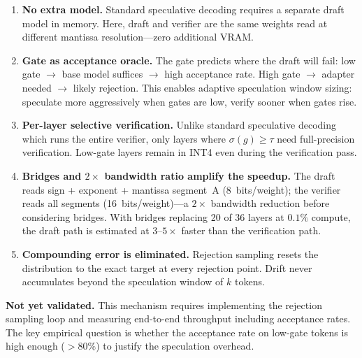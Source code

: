 \documentclass{article}
\begin{document}
\begin{enumerate}[nosep,leftmargin=1.5em]
\item \textbf{No extra model.} Standard speculative decoding requires a
      separate draft model in memory. Here, draft and verifier are the
      same weights read at different mantissa resolution---zero
      additional VRAM.
\item \textbf{Gate as acceptance oracle.} The gate predicts where the
      draft will fail: low gate $\rightarrow$ base model suffices
      $\rightarrow$ high acceptance rate. High gate $\rightarrow$ adapter
      needed $\rightarrow$ likely rejection. This enables adaptive
      speculation window sizing: speculate more aggressively when gates
      are low, verify sooner when gates rise.
\item \textbf{Per-layer selective verification.} Unlike standard
      speculative decoding which runs the entire verifier, only layers
      where $\sigma(g) \geq \tau$ need full-precision verification.
      Low-gate layers remain in INT4 even during the verification pass.
\item \textbf{Bridges and $2\times$ bandwidth ratio amplify the speedup.}
      The draft reads sign + exponent + mantissa segment~A
      (8~bits/weight); the verifier reads all segments
      (16~bits/weight)---a $2\times$ bandwidth reduction before
      considering bridges. With bridges replacing 20 of 36 layers at
      $0.1\%$ compute, the draft path is estimated at $3$--$5\times$
      faster than the verification path.
\item \textbf{Compounding error is eliminated.} Rejection sampling
      resets the distribution to the exact target at every rejection
      point. Drift never accumulates beyond the speculation window of
      $k$ tokens.
\end{enumerate}

\textbf{Not yet validated.} This mechanism requires implementing the
rejection sampling loop and measuring end-to-end throughput including
acceptance rates. The key empirical question is whether the acceptance
rate on low-gate tokens is high enough ($> 80\%$) to justify the
speculation overhead.

%
\end{document}
